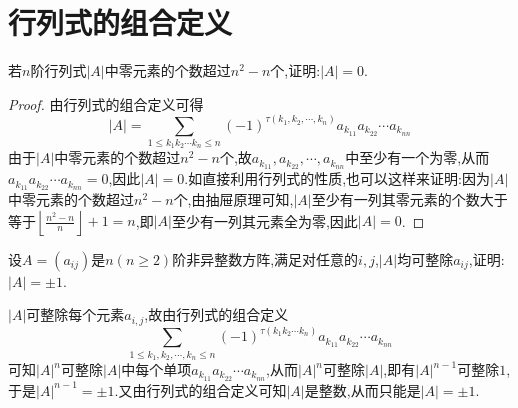 \documentclass[../../main.tex]{subfiles}
\begin{document}
\section{行列式的组合定义}

\begin{example}
若\(n\)阶行列式\(\vert A\vert\)中零元素的个数超过\(n^2 - n\)个,证明:\(\vert A\vert = 0\).
\end{example}
\begin{proof}
由行列式的组合定义可得
\[
|A|=\sum_{1\leqslant  k_1k_2\cdots k_n\leqslant  n}(-1)^{\tau (k_1,k_2,\cdots,k_n)}a_{k_{11}}a_{k_{22}}\cdots a_{k_{nn}}
\]
由于\(|A|\)中零元素的个数超过\(n^2 - n\)个,故\(a_{k_{11}},a_{k_{22}},\cdots,a_{k_{nn}}\)中至少有一个为零,从而\(a_{k_{11}}a_{k_{22}}\cdots a_{k_{nn}} = 0\),因此\(|A| = 0\).如直接利用行列式的性质,也可以这样来证明:因为\(|A|\)中零元素的个数超过\(n^2 - n\)个,由抽屉原理可知,\(|A|\)至少有一列其零元素的个数大于等于\(\left\lfloor\frac{n^2 - n}{n}\right\rfloor+ 1=n\),即\(|A|\)至少有一列其元素全为零,因此\(|A| = 0\).
\end{proof}

\begin{example}
设\(A=(a_{ij})\)是\(n(n\geqslant 2)\)阶非异整数方阵,满足对任意的\(i,j\),\(\vert A\vert\)均可整除\(a_{ij}\),证明:\(\vert A\vert=\pm1\).
\end{example}
\begin{solution}
\(\vert A\vert\)可整除每个元素\(a_{i,j}\),故由行列式的组合定义
\[
\sum_{1\le k_1,k_2,\cdots ,k_n\le n}{\left( -1 \right) ^{\tau \left( k_1k_2\cdots k_n \right)}a_{k_{11}}a_{k_{22}}\cdots a_{k_{nn}}}
\]
可知\(\vert A\vert^n\)可整除\(\vert A\vert\)中每个单项\(a_{k_{11}}a_{k_{22}}\cdots a_{k_{nn}}\),从而\(\vert A\vert^n\)可整除\(\vert A\vert\),即有\(\vert A\vert^{n - 1}\)可整除\(1\),于是\(\vert A\vert^{n - 1}=\pm1\).又由行列式的组合定义可知\(\vert A\vert\)是整数,从而只能是\(\vert A\vert=\pm1\).
\end{solution}
\end{document}
